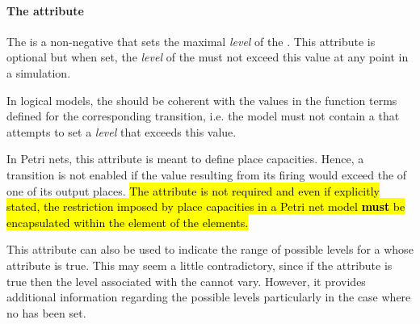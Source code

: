 \paragraph{The  attribute}
The  is a non-negative  that sets the maximal \emph{level} of the . This attribute is optional but when set, the \emph{level} of the \QualitativeSpecies must not exceed this value at any point in a simulation.

In logical models, the  should be coherent with the  values in the function terms defined for the corresponding transition, i.e. the model must not contain a \FunctionTerm that attempts to set a \emph{level} that exceeds this value.

In Petri nets, this attribute is meant to define place capacities. Hence, a transition is not enabled if the value resulting from its firing would exceed the   of one of its output places.  \hl{The attribute is not required and even if explicitly stated, the restriction imposed by place capacities in a Petri net model  \textbf{must} be encapsulated within the  element of the \FunctionTerm elements. }

This attribute can also be used to indicate the range of possible levels for a \QualitativeSpecies whose  attribute is true. This may seem a little contradictory, since if the  attribute is true then the level associated with the \QualitativeSpecies cannot vary. However, it provides additional information regarding the possible levels particularly in the case where no  has been set.

